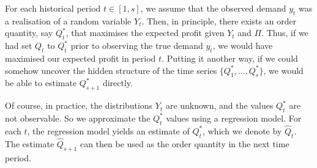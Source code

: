 \documentclass{article}
\begin{document}
For each historical period $t\in [1,s]$, we assume that the observed demand $y_t$ was a realisation of a random variable $Y_t$. Then, in principle, there exists an order quantity, say $Q_t^*$, that maximises the expected profit given $Y_t$ and $\Pi$. Thus, if we had set $Q_t$ to $Q_t^*$ prior to observing the true demand $y_t$, we would have maximised our expected profit in period $t$. Putting it another way, if we could somehow uncover the hidden structure of the time series $\big\{ Q_1^*,\dots,Q_s^* \big\}$, we would be able to estimate $Q_{s+1}^*$ directly.

Of course, in practice, the distributions $Y_t$ are unknown, and the values $Q_t^*$ are not observable. So we approximate the $Q_t^*$ values using a regression model. For each $t$, the regression model yields an estimate of $Q^*_t$, which we denote by $\hat{Q}_t$. The estimate $\hat{Q}_{s+1}$ can then be used as the order quantity in the next time period.
\end{document}
